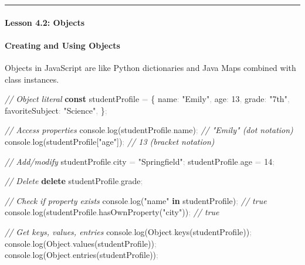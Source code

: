 \documentclass[
  justified,
  openright,
]{tufte-book}
\let\subsection\paragraph
\let\paragraph\paragraph
\newcommand{\KeywordTok}[1]{\textcolor{CodeKeyword}{\textbf{#1}}}  %
\newcommand{\StringTok}[1]{\textcolor{CodeString}{#1}}              %
\newcommand{\CommentTok}[1]{\textcolor{CodeComment}{\textit{#1}}}  %
\newcommand{\CodeNumTok}[1]{\textcolor{CodeNumber}{#1}}             %
\newcommand{\CodeFuncTok}[1]{\textcolor{CodeKeyword}{#1}}           %
\newcommand{\CodeTypeTok}[1]{\textcolor{CodeType}{#1}}              %
\newcommand{\OperatorTok}[1]{\textcolor{DarkGray}{#1}}              %
\newenvironment{Shaded}{%
  \begin{mdframed}[style=TufteCode]%
}{%
  \end{mdframed}%
}
\let\subsection\paragraph
\let\paragraph\paragraph
\begin{document}
\begin{center}\rule{0.5\linewidth}{0.5pt}\end{center}

\subsection{Lesson 4.2: Objects}\label{lesson-4.2-objects-1}

\subsection{Creating and Using
Objects}\label{creating-and-using-objects}

Objects in JavaScript are like Python dictionaries and Java Maps
combined with class instances.

\begin{Shaded}
\begin{Highlighting}[]
\CommentTok{// Object literal}
\KeywordTok{const} studentProfile \OperatorTok{=} \{
  \CodeTypeTok{name}\OperatorTok{:} \StringTok{"Emily"}\OperatorTok{,}
  \CodeTypeTok{age}\OperatorTok{:} \CodeNumTok{13}\OperatorTok{,}
  \CodeTypeTok{grade}\OperatorTok{:} \StringTok{"7th"}\OperatorTok{,}
  \CodeTypeTok{favoriteSubject}\OperatorTok{:} \StringTok{"Science"}\OperatorTok{,}
\}\OperatorTok{;}
 
\CommentTok{// Access properties}
console\OperatorTok{.}\CodeFuncTok{log}(studentProfile\OperatorTok{.}\CodeTypeTok{name})\OperatorTok{;} \CommentTok{// "Emily" (dot notation)}
console\OperatorTok{.}\CodeFuncTok{log}(studentProfile[\StringTok{"age"}])\OperatorTok{;} \CommentTok{// 13 (bracket notation)}
 
\CommentTok{// Add/modify}
studentProfile\OperatorTok{.}\CodeTypeTok{city} \OperatorTok{=} \StringTok{"Springfield"}\OperatorTok{;}
studentProfile\OperatorTok{.}\CodeTypeTok{age} \OperatorTok{=} \CodeNumTok{14}\OperatorTok{;}
 
\CommentTok{// Delete}
\KeywordTok{delete} studentProfile\OperatorTok{.}\CodeTypeTok{grade}\OperatorTok{;}
 
\CommentTok{// Check if property exists}
console\OperatorTok{.}\CodeFuncTok{log}(\StringTok{"name"} \KeywordTok{in} studentProfile)\OperatorTok{;} \CommentTok{// true}
console\OperatorTok{.}\CodeFuncTok{log}(studentProfile\OperatorTok{.}\CodeFuncTok{hasOwnProperty}(\StringTok{"city"}))\OperatorTok{;} \CommentTok{// true}
 
\CommentTok{// Get keys, values, entries}
console\OperatorTok{.}\CodeFuncTok{log}(Object\OperatorTok{.}\CodeFuncTok{keys}(studentProfile))\OperatorTok{;}
console\OperatorTok{.}\CodeFuncTok{log}(Object\OperatorTok{.}\CodeFuncTok{values}(studentProfile))\OperatorTok{;}
console\OperatorTok{.}\CodeFuncTok{log}(Object\OperatorTok{.}\CodeFuncTok{entries}(studentProfile))\OperatorTok{;}
\end{Highlighting}
\end{Shaded}
\end{document}
